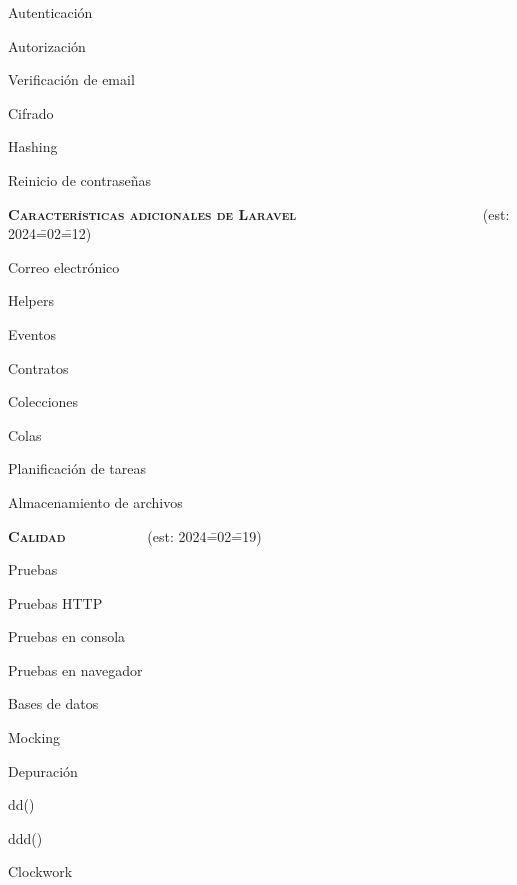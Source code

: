 \begin{longenum}
    \begin{longenum}
        \item Autenticación
        \item Autorización
        \item Verificación de email
        \item Cifrado
        \item Hashing
        \item Reinicio de contraseñas
    \end{longenum}
    \item \textbf{\textsc{Características adicionales de Laravel}} \ \ \ \ \ \ \ \ \ \ \ \ \ \ \ \ \ \ \ \ \ \ \ \ \ \ (est: 2024\==02\==12)
    \begin{longenum}
        \item Correo electrónico
        \item Helpers
        \item Eventos
        \item Contratos
        \item Colecciones
        \item Colas
        \item Planificación de tareas
        \item Almacenamiento de archivos
    \end{longenum}
    \item \textbf{\textsc{Calidad}} \ \ \ \ \ \ \ \ \ \ \ (est: 2024\==02\==19)
    \begin{longenum}
        \item Pruebas
        \begin{longenum}
            \item Pruebas HTTP
            \item Pruebas en consola
            \item Pruebas en navegador
            \item Bases de datos
            \item Mocking
        \end{longenum}
        \item Depuración
        \begin{longenum}
            \item dd()
            \item ddd()
            \item Clockwork

\end{longenum}
\end{longenum}
\end{longenum}
